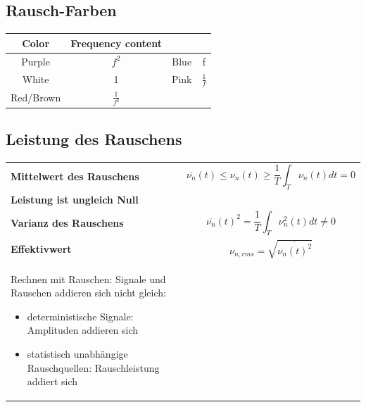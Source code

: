 \subsection{Rausch-Farben}
\begin{tabular}{|c|c|c|c|}
\hline
\textbf{Color}&\textbf{Frequency content} &&\\
\hline
	Purple&$f^2$ & Blue&f\\
\hline
	White&1 & Pink&$\frac{1}{f}$\\
\hline
	Red/Brown&$\frac{1}{f^2}$ && \\
\hline
\end{tabular}

\subsection{Leistung des Rauschens}
\begin{tabular}{ll}
\textbf{Mittelwert des Rauschens}&
\begin{minipage}{9cm}
\begin{equation*}
\overline{\nu_{n}}(t)\leq \nu_{n}(t)\geq \frac{1}{T}\int_{T}\nu_{n}(t)dt=0
\end{equation*}
\end{minipage}
\\
\textbf{Leistung ist ungleich Null}&\\
\textbf{Varianz des Rauschens}&
\begin{minipage}{9cm}
\begin{equation*}
\overline{\nu_{n}}(t)^2=\frac{1}{T}\int_{T}\nu^2_{n}(t)dt\neq0
\end{equation*}
\end{minipage}
\\
\textbf{Effektivwert}&
\begin{minipage}{9cm}
\begin{equation*}
\nu_{n,rms}=\sqrt{\overline{\nu_{n}(t)^2}}
\end{equation*}
\end{minipage}
\\
\begin{minipage}{9cm}
Rechnen mit Rauschen: Signale und Rauschen addieren sich nicht gleich:
\begin{itemize}
  \item deterministische Signale: Amplituden addieren sich
  \item statistisch unabhängige Rauschquellen: Rauschleistung addiert sich
\end{itemize}
\end{minipage}
&
\\
\end{tabular}

